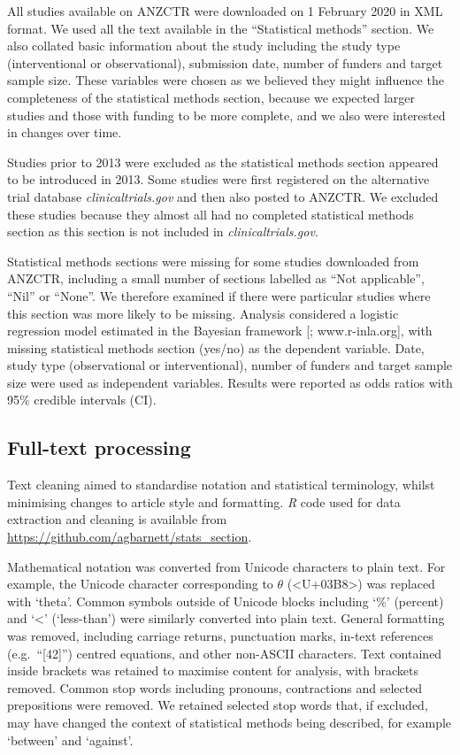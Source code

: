 \documentclass[12pt]{article}
\begin{document}
All studies available on ANZCTR were downloaded on 1 February 2020 in
XML format. We used all the text available in the ``Statistical
methods'' section. We also collated basic information about the study
including the study type (interventional or observational), submission
date, number of funders and target sample size. These variables were
chosen as we believed they might influence the completeness of the
statistical methods section, because we expected larger studies and
those with funding to be more complete, and we also were interested in
changes over time.

Studies prior to 2013 were excluded as the statistical methods section
appeared to be introduced in 2013. Some studies were first registered on
the alternative trial database \emph{clinicaltrials.gov} and then also
posted to ANZCTR. We excluded these studies because they almost all had
no completed statistical methods section as this section is not included
in \emph{clinicaltrials.gov}.

Statistical methods sections were missing for some studies downloaded
from ANZCTR, including a small number of sections labelled as ``Not
applicable'', ``Nil'' or ``None''. We therefore examined if there were
particular studies where this section was more likely to be missing.
Analysis considered a logistic regression model estimated in the
Bayesian framework {[}\citet{INLA}; www.r-inla.org{]}, with missing
statistical methods section (yes/no) as the dependent variable. Date,
study type (observational or interventional), number of funders and
target sample size were used as independent variables. Results were
reported as odds ratios with 95\% credible intervals (CI).

\subsection{Full-text processing}
\label{sec:methods-cleaning}

Text cleaning aimed to standardise notation and statistical terminology,
whilst minimising changes to article style and formatting. \emph{R} code
used for data extraction and cleaning is available from
\url{https://github.com/agbarnett/stats_section}.

Mathematical notation was converted from Unicode characters to plain
text. For example, the Unicode character corresponding to \(\theta\)
(\textless U+03B8\textgreater) was replaced with `theta'. Common symbols
outside of Unicode blocks including `\%' (percent) and `\textless{}'
(`less-than') were similarly converted into plain text. General
formatting was removed, including carriage returns, punctuation marks,
in-text references (e.g.~``{[}42{]}'') centred equations, and other
non-ASCII characters. Text contained inside brackets was retained to
maximise content for analysis, with brackets removed. Common stop words
including pronouns, contractions and selected prepositions were removed.
We retained selected stop words that, if excluded, may have changed the
context of statistical methods being described, for example `between'
and `against'.
\end{document}
